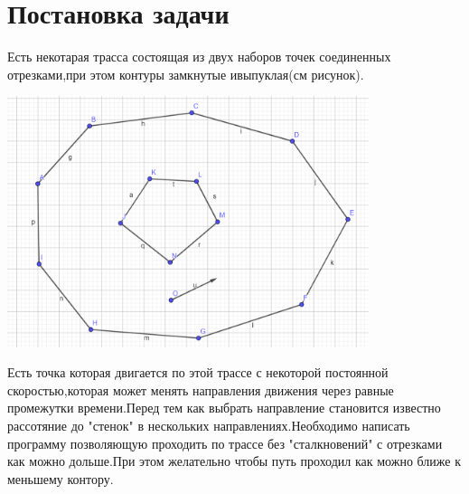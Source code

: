 \section{Постановка задачи}
    Есть некотарая трасса состоящая из двух наборов точек соединенных отрезками,при этом контуры замкнутые ивыпуклая(см рисунок). 

	
	\includegraphics[width=400px]{picture3.png}
	\parskip=0.3cm
	
	Есть точка которая двигается по этой трассе с некоторой постоянной скоростью,которая может менять направления движения через равные промежутки времени.Перед тем как выбрать направление становится известно рассотяние до "стенок" в нескольких направлениях.Необходимо написать программу позволяющую проходить по трассе без "сталкновений" с отрезками как можно дольше.При этом желательно чтобы путь проходил как можно ближе к меньшему контору.
	